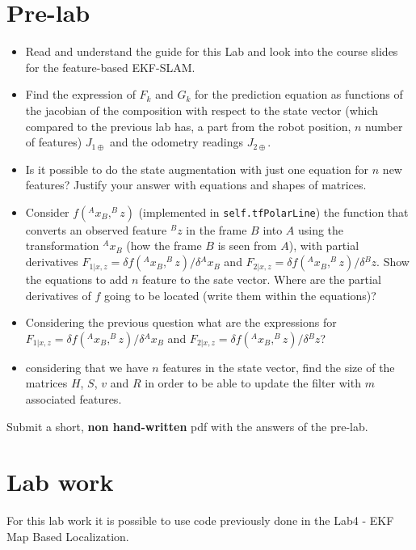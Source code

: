 \documentclass[a4paper,10pt]{article}
\begin{document}
\section{Pre-lab}
\begin{itemize}
	\item Read and understand the guide for this Lab and look into the course slides for the feature-based EKF-SLAM.
	\item Find the expression of $F_k$ and $G_k$ for the prediction equation as functions of the jacobian of the composition with respect to the state vector (which compared to the previous lab has, a part from the robot position, $n$ number of features) $J_{1\oplus}$ and the odometry readings $J_{2\oplus}$.
	\item Is it possible to do the state augmentation with just one equation for $n$ new features? Justify your answer with equations and shapes of matrices.
	\item Consider $f(^Ax_B,^Bz)$ (implemented in \texttt{self.tfPolarLine}) the function that converts an observed feature $^Bz$ in the frame $B$ into $A$ using the transformation $^Ax_B$ (how the frame $B$ is seen from  $A$), with partial derivatives $F_{1|x,z}=\delta f(^Ax_B,^Bz) / \delta {^Ax_B}$ and $F_{2|x,z}=\delta f(^Ax_B,^Bz) / \delta{^Bz}$. Show the equations to add $n$ feature to the sate vector. Where are the partial derivatives of $f$ going to be located (write them within the equations)? 
	\item Considering the previous question what are the expressions for $F_{1|x,z}=\delta f(^Ax_B,^Bz) / \delta {^Ax_B}$ and $F_{2|x,z}=\delta f(^Ax_B,^Bz) / \delta{^Bz}$?
	\item considering that we have $n$ features in the state vector, find the size of the matrices $H$, $S$, $v$ and $R$ in order to be able to update the filter with $m$ associated features.
\end{itemize}
Submit a short, \textbf{non hand-written} pdf with the answers of the pre-lab.

\section{Lab work}
For this lab work it is possible to use code previously done in the Lab4 - EKF Map Based Localization.
\end{document}
